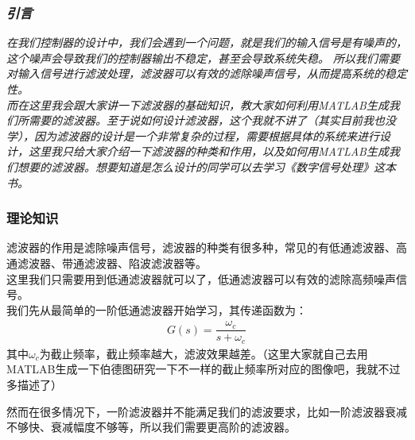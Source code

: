 \documentclass[UTF8,a4paper,12pt]{ctexart}
\begin{document}
        \subsubsection{\textit{引言}}
        \begin{flushleft}
          \textit{在我们控制器的设计中，我们会遇到一个问题，就是我们的输入信号是有噪声的，这个噪声会导致我们的控制器输出不稳定，甚至会导致系统失稳。
          所以我们需要对输入信号进行滤波处理，滤波器可以有效的滤除噪声信号，从而提高系统的稳定性。\\
          而在这里我会跟大家讲一下滤波器的基础知识，教大家如何利用MATLAB生成我们所需要的滤波器。至于说如何设计滤波器，这个我就不讲了（其实目前我也没学），因为滤波器的设计是一个非常复杂的过程，需要根据具体的系统来进行设计，这里我只给大家介绍一下滤波器的种类和作用，以及如何用MATLAB生成我们想要的滤波器。想要知道是怎么设计的同学可以去学习《数字信号处理》这本书。}
          
        \end{flushleft}
      \subsubsection{理论知识}
      \begin{flushleft}
        滤波器的作用是滤除噪声信号，滤波器的种类有很多种，常见的有低通滤波器、高通滤波器、带通滤波器、陷波滤波器等。\\
        这里我们只需要用到低通滤波器就可以了，低通滤波器可以有效的滤除高频噪声信号。\\
        我们先从最简单的一阶低通滤波器开始学习，其传递函数为：
        \begin{align*}
          G(s)=\dfrac{\omega _{c}}{s+\omega _{c}}
        \end{align*}
        其中$\omega _{c}$为截止频率，截止频率越大，滤波效果越差。（这里大家就自己去用MATLAB生成一下伯德图研究一下不一样的截止频率所对应的图像吧，我就不过多描述了）
      \end{flushleft}

      \begin{flushleft}
       然而在很多情况下，一阶滤波器并不能满足我们的滤波要求，比如一阶滤波器衰减不够快、衰减幅度不够等，所以我们需要更高阶的滤波器。
        \end{flushleft}
\end{document}
